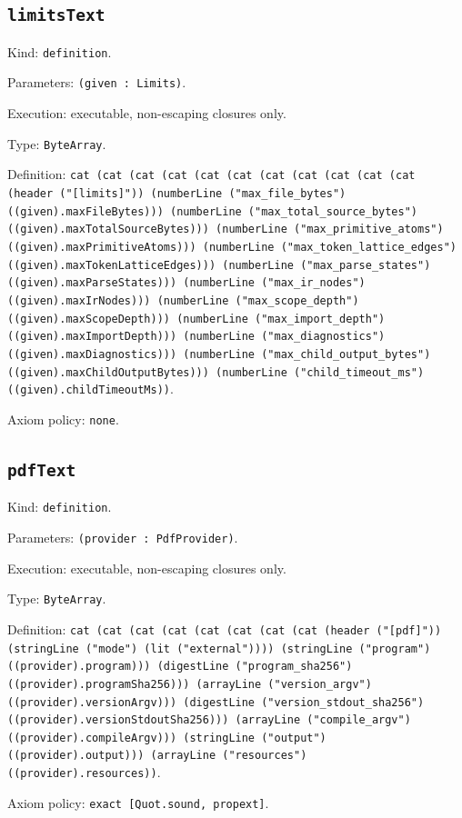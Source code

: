 \documentclass[11pt]{article}
\begin{document}
\subsection*{\texttt{limitsText}}
\noindent Kind: \texttt{definition}.\par
\noindent Parameters: \texttt{(given : Limits)}.\par
\noindent Execution: executable, non-escaping closures only.\par
\noindent Type: \texttt{ByteArray}.\par
\noindent Definition: \texttt{cat (cat (cat (cat (cat (cat (cat (cat (cat (cat (cat (header ("[limits]")) (numberLine ("max\_file\_bytes") ((given).maxFileBytes))) (numberLine ("max\_total\_source\_bytes") ((given).maxTotalSourceBytes))) (numberLine ("max\_primitive\_atoms") ((given).maxPrimitiveAtoms))) (numberLine ("max\_token\_lattice\_edges") ((given).maxTokenLatticeEdges))) (numberLine ("max\_parse\_states") ((given).maxParseStates))) (numberLine ("max\_ir\_nodes") ((given).maxIrNodes))) (numberLine ("max\_scope\_depth") ((given).maxScopeDepth))) (numberLine ("max\_import\_depth") ((given).maxImportDepth))) (numberLine ("max\_diagnostics") ((given).maxDiagnostics))) (numberLine ("max\_child\_output\_bytes") ((given).maxChildOutputBytes))) (numberLine ("child\_timeout\_ms") ((given).childTimeoutMs))}.\par
\noindent Axiom policy: \texttt{none}.\par
\subsection*{\texttt{pdfText}}
\noindent Kind: \texttt{definition}.\par
\noindent Parameters: \texttt{(provider : PdfProvider)}.\par
\noindent Execution: executable, non-escaping closures only.\par
\noindent Type: \texttt{ByteArray}.\par
\noindent Definition: \texttt{cat (cat (cat (cat (cat (cat (cat (cat (header ("[pdf]")) (stringLine ("mode") (lit ("external")))) (stringLine ("program") ((provider).program))) (digestLine ("program\_sha256") ((provider).programSha256))) (arrayLine ("version\_argv") ((provider).versionArgv))) (digestLine ("version\_stdout\_sha256") ((provider).versionStdoutSha256))) (arrayLine ("compile\_argv") ((provider).compileArgv))) (stringLine ("output") ((provider).output))) (arrayLine ("resources") ((provider).resources))}.\par
\noindent Axiom policy: \texttt{exact [Quot.sound, propext]}.\par
\end{document}
